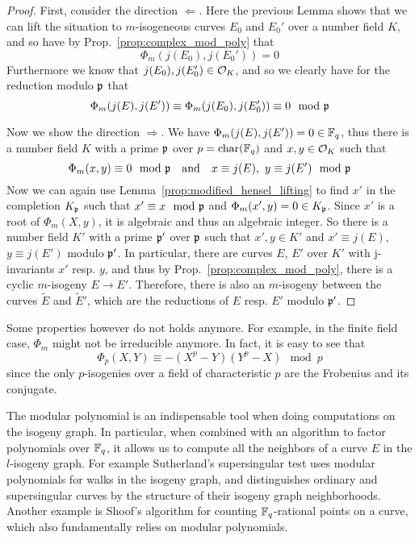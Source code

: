 \begin{proof}
    First, consider the direction $\Leftarrow$.
    Here the previous Lemma shows that we can lift the situation to $m$-isogeneous curves $E_0$ and $E_0'$ over a number field $K$, and so have by Prop.~\ref{prop:complex_mod_poly} that
    \begin{equation*}
        \Phi_m(j(E_0), j(E_0')) = 0
    \end{equation*}
    Furthermore we know that $j(E_0), j(E_0') \in \mathcal{O}_K$, and so we clearly have for the reduction modulo $\mathfrak{p}$ that
    \begin{equation*}
        \Phi_m(j(E), j(E')) \equiv \Phi_m(j(E_0), j(E_0')) \equiv 0 \mod {\mathfrak{p}}
    \end{equation*}

    Now we show the direction $\Rightarrow$.
    We have $\Phi_m(j(E), j(E')) = 0 \in \mathbb{F}_q$, thus there is a number field $K$ with a prime $\mathfrak{p}$ over $p = \mathrm{char}(\mathbb{F}_q)$ and $x, y \in \mathcal{O}_K$ such that
    \begin{equation*}
        \Phi_m(x, y) \equiv 0 \mod {\mathfrak{p}} \quad \text{and} \quad x \equiv j(E), \ y \equiv j(E') \mod {\mathfrak{p}}
    \end{equation*}
    Now we can again use Lemma~\ref{prop:modified_hensel_lifting} to find $x'$ in the completion $K_{\mathfrak{p}}$ such that $x' \equiv x \mod {\mathfrak{p}}$ and $\Phi_m(x', y) = 0 \in K_{\mathfrak{p}}$.
    Since $x'$ is a root of $\Phi_m(X, y)$, it is algebraic and thus an algebraic integer.
    So there is a number field $K'$ with a prime $\mathfrak{p}'$ over $\mathfrak{p}$ such that $x', y \in K'$ and $x' \equiv j(E)$, $y \equiv j(E')$ modulo $\mathfrak{p}'$.
    In particular, there are curves $E$, $E'$ over $K'$ with j-invariants $x'$ resp. $y$, and thus by Prop.~\ref{prop:complex_mod_poly}, there is a cyclic $m$-isogeny $E \to E'$.
    Therefore, there is also an $m$-isogeny between the curves $\tilde{E}$ and $\tilde{E}'$, which are the reductions of $E$ resp. $E'$ modulo $\mathfrak{p}'$.
\end{proof}
Some properties however do not holds anymore.
For example, in the finite field case, $\Phi_m$ might not be irreducible anymore.
In fact, it is easy to see that
\begin{equation*}
    \Phi_p(X, Y) \equiv -(X^p - Y)(Y^p - X) \mod p
\end{equation*}
since the only $p$-isogenies over a field of characteristic $p$ are the Frobenius and its conjugate.

The modular polynomial is an indispensable tool when doing computations on the isogeny graph.
In particular, when combined with an algorithm to factor polynomials over $\mathbb{F}_q$, it allows us to compute all the neighbors of a curve $E$ in the $l$-isogeny graph.
For example Sutherland's supersingular test \cite{sutherland_supersingularity_test} uses modular polynomials for walks in the isogeny graph, and distinguishes ordinary and supersingular curves by the structure of their isogeny graph neighborhoods.
Another example is Shoof's algorithm \cite{shoof_point_counting} for counting $\mathbb{F}_q$-rational points on a curve, which also fundamentally relies on modular polynomials.

